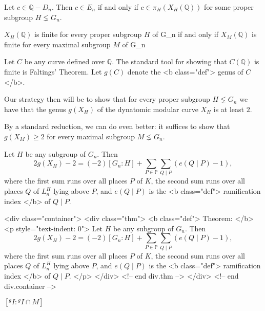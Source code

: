 Let \( c \in \mathbb{Q} -D_n \). Then \( c \in E_n \) if and only if \( c \in \pi_H (X_H (\mathbb{Q}  )) \) for some proper subgroup \( H \lneq G_n \). 

\( X_H (\mathbb{Q} ) \) is finite for every proper subgroup \( H \) of G_n if and only if \( X_M (\mathbb{Q} ) \) is finite for every maximal subgroup \( M \) of G_n

Let \( C \) be any curve defined over \( \mathbb{Q}  \). The standard tool for showing that \( C(\mathbb{Q} ) \) is finite is Faltings' Theorem. Let \( g(C) \) denote the <b class="def"> genus of \( C \)  </b>.  

Our strategy then will be to show that for every proper subgroup \( H \lneq G_n \) we have that the genus \( g(X_H) \) of the dynatomic modular curve \( X_H \) is at least \( 2 \). 

By a standard reduction, we can do even better: it suffices to show that \( g(X_M) \ge 2 \) for every maximal subgroup \( M \lneq G_n \).  

Let \( H \) be any subgroup of \( G_n \). Then
\[ 
	2g(X_H) - 2 = (-2)[G_n:H] + \sum_{P \in \mathbb{P}  } \sum_{Q \mid P}  (e (Q \mid P)    -1),
\]
where the first sum runs over all places \( P \) of \( K \), the second sum runs over all places \( Q \) of \( L_n^H \) lying above \( P \), and \(  e (Q \mid P)     \) is the <b class="def"> ramification index </b>  of \( Q \mid P \).

 <div class="container">
        <div class="thm">
          <b class="def">
            Theorem:
          </b> 
          <p style="text-indent: 0">
            Let \( H \) be any subgroup of \( G_n \). Then
      \[ 
        2g(X_H) - 2 = (-2)[G_n:H] + \sum_{P \in \mathbb{P}  } \sum_{Q \mid P}  (e (Q \mid P)    -1),
      \]
      where the first sum runs over all places \( P \) of \( K \), the second sum runs over all places \( Q \) of \( L_n^H \) lying above \( P \), and \(  e (Q \mid P)     \) is the <b class="def"> ramification index </b>  of \( Q \mid P \).
          </p>
        </div> <!-- end div.thm -->
      </div> <!-- end div.container -->

      \( [{ }^{ g } I : { }^{ g } I \cap M ] \) 